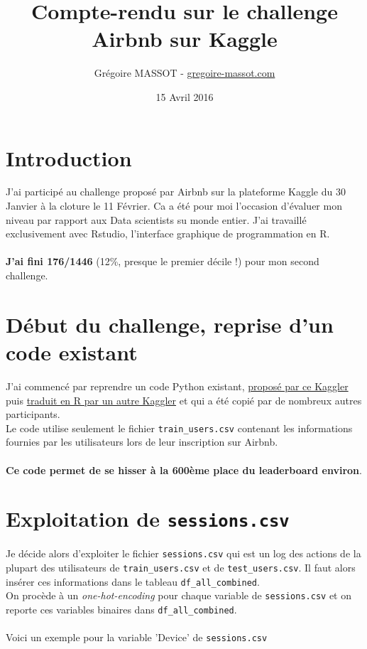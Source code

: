 \documentclass[a4paper,11pt]{article}
\title{Compte-rendu sur le challenge Airbnb sur Kaggle}
\author{Grégoire MASSOT - \href{http://www.gregoire-massot.com}{gregoire-massot.com}}
\date{15 Avril 2016}
\begin{document}
\sffamily
\maketitle

\section*{Introduction}
J’ai participé au challenge proposé par Airbnb sur la plateforme Kaggle du 30 Janvier à la cloture le 11 Février. Ca a été pour moi l’occasion d’évaluer mon niveau par rapport aux Data scientists su monde entier. J'ai travaillé exclusivement avec Rstudio, l'interface graphique de programmation en R.
\\
\\
\textbf{J’ai fini 176/1446} (12\%, presque le premier décile !) pour mon second challenge.

\section*{Début du challenge, reprise d'un code existant}

J’ai commencé par reprendre un code Python existant, \href{https://www.kaggle.com/svpons/airbnb-recruiting-new-user-bookings/script-0-8655}{proposé par ce Kaggler} puis \href{https://www.kaggle.com/indradenbakker/airbnb-recruiting-new-user-bookings/rscript-0-86547}{traduit en R par un autre Kaggler} et qui a été copié par de nombreux autres participants. 
\\
Le code utilise seulement le fichier \texttt{train\_users.csv} contenant les informations fournies par les utilisateurs lors de leur inscription sur Airbnb. 
\\
\\
\textbf{Ce code permet de se hisser à la 600ème place du leaderboard environ}.

\section*{Exploitation de \texttt{sessions.csv}}

Je décide alors d'exploiter le fichier \texttt{sessions.csv} qui est un log des actions de la plupart des utilisateurs de \texttt{train\_users.csv} et de \texttt{test\_users.csv}. Il faut alors insérer ces informations dans le tableau \texttt{df\_all\_combined}.
\\
On procède à un \textit{one-hot-encoding} pour chaque variable de \texttt{sessions.csv} et on reporte ces variables binaires dans \texttt{df\_all\_combined}.
\\
\\
Voici un exemple pour la variable 'Device' de \texttt{sessions.csv}
\end{document}
